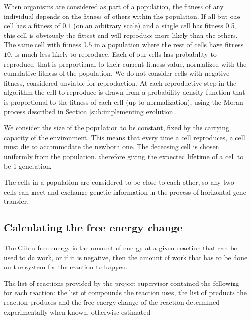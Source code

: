 \documentclass[a4paper,12pt]{article}
\begin{document}
	When organisms are considered as part of a population, the fitness of any individual depends on the fitness of others within the population. If  all but one cell has a fitness of $0.1$ (on an arbitrary scale) and a single cell has fitness 0.5, this cell is obviously the fittest and will reproduce more likely than the others. The same cell with fitness $0.5$ in a population where the rest of cells have fitness $10$, is much less likely to reproduce. Each of our cells has probability to reproduce, that is proportional to their current fitness value, normalized with the cumulative fitness of the population. We do not consider cells with negative fitness, considered unviable for reproduction. At each reproductive step in the algorithm the cell to reproduce is drawn from a probability density function that is proportional to the fitness of each cell (up to normalization), using the Moran process described in Section \ref{sub:implementing evolution}.


	We consider the size of the population to be constant, fixed by the carrying capacity of the environment. This means that every time a cell reproduces, a cell must die to accommodate the newborn one. The deceasing cell is chosen uniformly from the population, therefore giving the expected lifetime of a cell to be 1 generation.

	The cells in a population are considered to be close to each other, so any two cells can meet and exchange genetic information in the process of horizontal gene transfer.

\subsection{Calculating the free energy change}
\label{sub:The free energy change}

	The Gibbs free energy is the amount of energy at a given reaction that can be used to do work, or if it is negative, then the amount of work that has to be done on the system for the reaction to happen. 


	The list of reactions provided by the project supervisor contained the following for each reaction: the list of compounds the reaction uses, the list of products the reaction produces and the free energy change of the reaction determined experimentally when known, otherwise estimated.
	
\end{document}
